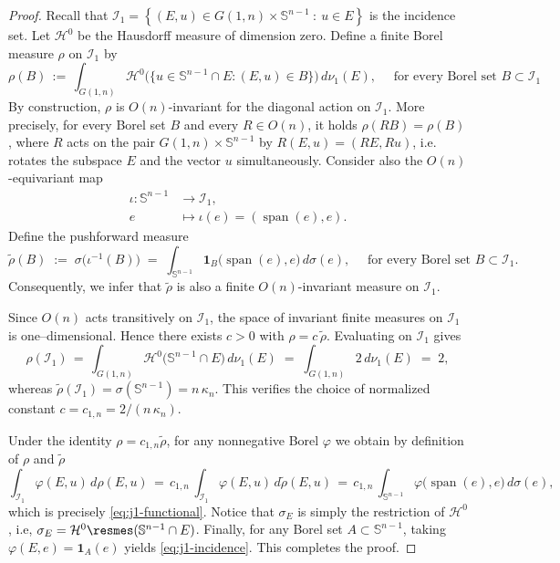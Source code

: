 \documentclass[11pt]{article}
\theoremstyle{definition}
\numberwithin{equation}{section}
\begin{document}
\begin{proof}
Recall that $\mathcal I_1 = \left\{ (E,u)\in G(1,n)\times \mathbb S^{n-1} ~:~ u\in E \right\}$ is the incidence set.
Let $\mathcal H^0$ be the Hausdorff measure of dimension zero.
Define a finite Borel measure \(\rho\) on \(\mathcal I_1 \) by
\[
\rho(B) \,:=\, \int_{G(1,n)} \mathcal H^{0}\!\bigl(\{u\in \mathbb S^{n-1}\cap E:(E,u)\in B\}\bigr)\,d\nu_1(E), \quad \text{ for every Borel set } B \subset \mathcal I_1
\]
By construction, \(\rho\) is \(O(n)\)-invariant for the diagonal action on \(\mathcal I_1\).
More precisely, for every Borel set $B$ and every ${R \in O(n)}$, it holds $\rho(RB) = \rho(B)$, where $R$ acts on the pair $G(1, n) \times \mathbb S^{n - 1}$ by $R(E, u) = (RE, Ru)$, i.e. rotates the subspace 
$E$ and the vector $u$ simultaneously.
Consider also the \(O(n)\)-equivariant map
\begin{align*}
\iota:\mathbb S^{n-1} & \to\mathcal I_1, \\
 e & \mapsto \iota(e) = (\operatorname{span}(e),e).
\end{align*}
Define the pushforward measure
\[
\tilde\rho(B)\;:=\;\sigma\bigl(\iota^{-1}(B)\bigr)\;=\;\int_{\mathbb S^{n-1}}\mathbf 1_{B}\bigl(\operatorname{span}(e),e\bigr)\,d\sigma(e),
\quad \text{ for every Borel set } B \subset \mathcal I_1.
\]
Consequently, we infer that \(\tilde\rho\) is also a finite \(O(n)\)-invariant measure on \(\mathcal I_1 \).

\medskip

Since \(O(n)\) acts transitively on \( \mathcal I_1\), the space of invariant finite measures on \( \mathcal I_1 \) is one–dimensional.
Hence there exists \(c>0\) with
\(\rho=c\,\tilde\rho\).
Evaluating on \(\mathcal I_1 \) gives
\[
\rho(\mathcal I_1) \,=\, \int_{G(1,n)} \mathcal H^{0}\!\bigl(\mathbb S^{n-1}\cap E\bigr)\,d\nu_1(E)
\;=\; \int_{G(1,n)} 2\,d\nu_1(E) \;=\; 2,
\]
whereas \(\tilde\rho(\mathcal I_1 ) = \sigma(\mathbb S^{n-1})=n\,\kappa_n\). 
This verifies the choice of normalized constant  \(c = c_{1, n} =2/(n\,\kappa_n) \).

\medskip

Under the identity $\rho = c_{1, n} \widetilde \rho$, for any nonnegative Borel \(\varphi\) we obtain by definition of \(\rho\) and \(\tilde\rho\)
\[
\int_{\mathcal I_1} \varphi(E,u)\,d\rho(E,u)
\, = \,
c_{1,n}\,\int_{\mathcal I_1}\varphi(E,u)\,d\tilde\rho(E,u)
\, = \,
c_{1,n}\,\int_{\mathbb S^{n-1}} \varphi\bigl(\operatorname{span}(e),e\bigr)\,d\sigma(e),
\]
which is precisely \eqref{eq:j1-functional}. 
Notice that $\sigma_E$ is simply the restriction of $\mathcal H^0$, i.e, $\sigma_E = \mathcal H^0 \resmes (\mathbb S^{n - 1} \cap E)$.
Finally, for any Borel set $A \subset \mathbb S^{n - 1}$, taking \(\varphi(E, e)=\mathbf 1_A( e )\) yields \eqref{eq:j1-incidence}. This completes the proof.
\end{proof}
\end{document}
